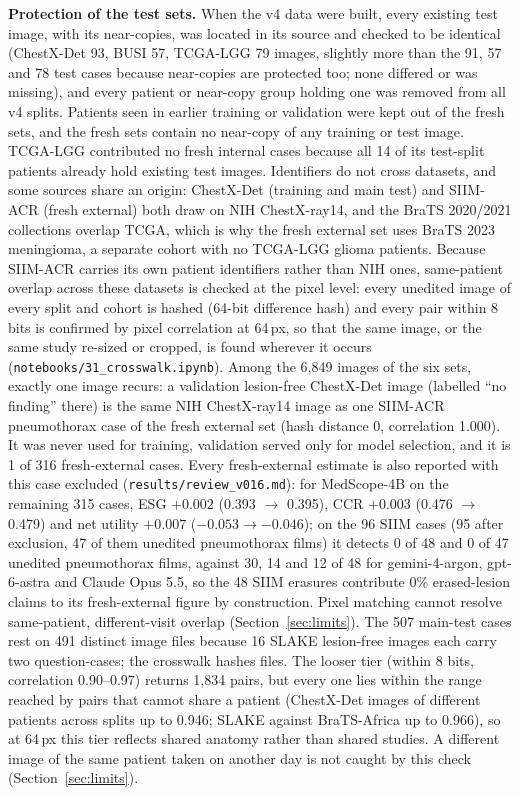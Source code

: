 \documentclass[11pt]{article}
\begin{document}
\textbf{Protection of the test sets.} When the v4 data were built, every existing test image, with its near-copies, was located in its source and checked to be identical (ChestX-Det 93, BUSI 57, TCGA-LGG 79 images, slightly more than the 91, 57 and 78 test cases because near-copies are protected too; none differed or was missing), and every patient or near-copy group holding one was removed from all v4 splits. Patients seen in earlier training or validation were kept out of the fresh sets, and the fresh sets contain no near-copy of any training or test image. TCGA-LGG contributed no fresh internal cases because all 14 of its test-split patients already hold existing test images. Identifiers do not cross datasets, and some sources share an origin: ChestX-Det (training and main test) and SIIM-ACR (fresh external) both draw on NIH ChestX-ray14, and the BraTS 2020/2021 collections overlap TCGA, which is why the fresh external set uses BraTS 2023 meningioma, a separate cohort with no TCGA-LGG glioma patients. Because SIIM-ACR carries its own patient identifiers rather than NIH ones, same-patient overlap across these datasets is checked at the pixel level: every unedited image of every split and cohort is hashed (64-bit difference hash) and every pair within 8 bits is confirmed by pixel correlation at 64\,px, so that the same image, or the same study re-sized or cropped, is found wherever it occurs (\texttt{notebooks/31\_crosswalk.ipynb}). Among the 6,849 images of the six sets, exactly one image recurs: a validation lesion-free ChestX-Det image (labelled ``no finding'' there) is the same NIH ChestX-ray14 image as one SIIM-ACR pneumothorax case of the fresh external set (hash distance 0, correlation 1.000). It was never used for training, validation served only for model selection, and it is 1 of 316 fresh-external cases. Every fresh-external estimate is also reported with this case excluded (\texttt{results/review\_v016.md}): for MedScope-4B on the remaining 315 cases, ESG $+0.002$ (0.393 $\to$ 0.395), CCR $+0.003$ (0.476 $\to$ 0.479) and net utility $+0.007$ ($-0.053 \to -0.046$); on the 96 SIIM cases (95 after exclusion, 47 of them unedited pneumothorax films) it detects 0 of 48 and 0 of 47 unedited pneumothorax films, against 30, 14 and 12 of 48 for gemini-4-argon, gpt-6-astra and Claude Opus 5.5, so the 48 SIIM erasures contribute 0\% erased-lesion claims to its fresh-external figure by construction. Pixel matching cannot resolve same-patient, different-visit overlap (Section~\ref{sec:limits}). The 507 main-test cases rest on 491 distinct image files because 16 SLAKE lesion-free images each carry two question-cases; the crosswalk hashes files. The looser tier (within 8 bits, correlation 0.90--0.97) returns 1,834 pairs, but every one lies within the range reached by pairs that cannot share a patient (ChestX-Det images of different patients across splits up to 0.946; SLAKE against BraTS-Africa up to 0.966), so at 64\,px this tier reflects shared anatomy rather than shared studies. A different image of the same patient taken on another day is not caught by this check (Section~\ref{sec:limits}).
\end{document}
